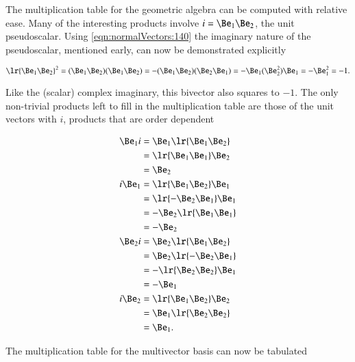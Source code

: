 %
%
The multiplication table for the  geometric algebra can be computed with relative ease.
Many of the interesting products involve \( i = \Be_1 \Be_2 \), the unit pseudoscalar.
Using \cref{eqn:normalVectors:140} the imaginary nature of the pseudoscalar, mentioned early, can now be demonstrated explicitly

\begin{dmath}\label{eqn:2dMultiplication:220}
   \lr{ \Be_1 \Be_2 }^2
   =
   (\Be_1 \Be_2)(\Be_1 \Be_2)
   =
   -(\Be_1 \Be_2)(\Be_2 \Be_1)
   =
   -\Be_1 (\Be_2^2 ) \Be_1
   =
   -\Be_1^2
   = -1.
\end{dmath}

Like the (scalar) complex imaginary, this bivector also squares to \( -1 \).
The only non-trivial products left to fill in the  multiplication table are those of the unit vectors with \( i \), products that are order dependent

\begin{dmath}\label{eqn:2dMultiplication:180}
\begin{aligned}
   \Be_1 i &= \Be_1 \lr{ \Be_1 \Be_2 } \\
           &= \lr{ \Be_1 \Be_1 } \Be_2 \\
           &= \Be_2 \\
   i \Be_1 &= \lr{ \Be_1 \Be_2 } \Be_1 \\
           &= \lr{ -\Be_2 \Be_1 } \Be_1 \\
           &= -\Be_2 \lr{ \Be_1 \Be_1 } \\
           &= -\Be_2 \\
   \Be_2 i &= \Be_2 \lr{ \Be_1 \Be_2 } \\
           &= \Be_2 \lr{ -\Be_2 \Be_1 } \\
           &= -\lr{ \Be_2 \Be_2 }\Be_1 \\
           &= -\Be_1 \\
   i \Be_2 &= \lr{ \Be_1 \Be_2 } \Be_2 \\
           &= \Be_1 \lr{ \Be_2 \Be_2 } \\
           &= \Be_1.
\end{aligned}
\end{dmath}

The multiplication table for the  multivector basis can now be tabulated


